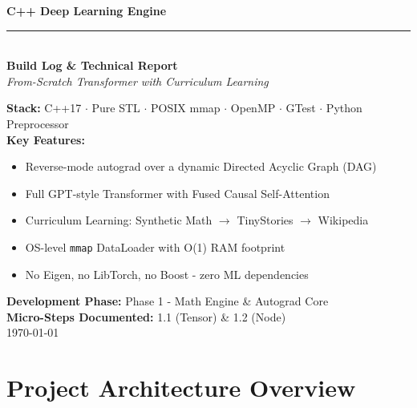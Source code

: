 \documentclass[12pt, a4paper]{article}
\begin{document}
\begin{titlepage}
  \centering
  \vspace*{2cm}

  {\Huge\bfseries\color{engineblue}
    C++ Deep Learning Engine}\\[0.6em]

  {\large\color{accentgold}\rule{10cm}{1.5pt}}\\[0.6em]

  {\Large\bfseries Build Log \& Technical Report}\\[0.4em]
  {\large\textit{From-Scratch Transformer with Curriculum Learning}}\\[2em]

  \begin{tcolorbox}[designbox, width=0.85\textwidth, halign=left]
    \textbf{Stack:} C++17 \(\cdot\) Pure STL \(\cdot\) POSIX mmap \(\cdot\)
    OpenMP \(\cdot\) GTest \(\cdot\) Python Preprocessor\\[4pt]
    \textbf{Key Features:}
    \begin{itemize}[noitemsep, topsep=2pt, leftmargin=1.4em]
      \item Reverse-mode autograd over a dynamic Directed Acyclic Graph (DAG)
      \item Full GPT-style Transformer with Fused Causal Self-Attention
      \item Curriculum Learning: Synthetic Math \(\to\) TinyStories \(\to\) Wikipedia
      \item OS-level \texttt{mmap} DataLoader with O(1) RAM footprint
      \item No Eigen, no LibTorch, no Boost - zero ML dependencies
    \end{itemize}
  \end{tcolorbox}

  \vfill

  {\large\textbf{Development Phase:} Phase 1 - Math Engine \& Autograd Core}\\[0.3em]
  {\large\textbf{Micro-Steps Documented:} 1.1 (Tensor) \& 1.2 (Node)}\\[0.3em]
  {\large\today}
\end{titlepage}

\tableofcontents
\newpage

\section{Project Architecture Overview}
\end{document}
